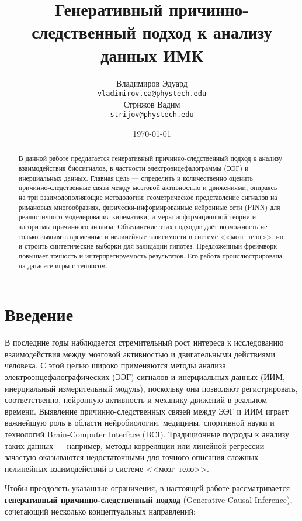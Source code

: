 \documentclass[a4paper, 12pt]{article}
\title{Генеративный причинно-следственный подход к анализу данных ИМК}
\author{Владимиров Эдуард \\
	\texttt{vladimirov.ea@phystech.edu} \\
	\And
	Стрижов Вадим \\
	\texttt{strijov@phystech.edu}
}
\date{\today}
\begin{document}
	\maketitle
	
	\begin{abstract}
		В данной работе предлагается генеративный причинно-следственный подход к анализу взаимодействия биосигналов, в частности электроэнцефалограммы (ЭЭГ) и инерциальных данных. Главная цель --- определить и количественно оценить причинно-следственные связи между мозговой активностью и движениями, опираясь на три взаимодополняющие методологии: геометрическое представление сигналов на римановых многообразиях, физически-информированные нейронные сети (PINN) для реалистичного моделирования кинематики, и меры информационной теории и алгоритмы причинного анализа. Объединение этих подходов даёт возможность не только выявлять временные и нелинейные зависимости в системе <<мозг--тело>>, но и строить синтетические выборки для валидации гипотез. Предложенный фреймворк повышает точность и интерпретируемость результатов. Его работа проиллюстрирована на датасете игры с теннисом.

	\end{abstract}
	
	
	
	\section{Введение}
	
	В последние годы наблюдается стремительный рост интереса к исследованию взаимодействия между мозговой активностью и двигательными действиями человека. С этой целью широко применяются методы анализа электроэнцефалографических (ЭЭГ) сигналов и инерциальных данных (ИИМ, инерциальный измерительный модуль), поскольку они позволяют регистрировать, соответственно, нейронную активность и механику движений в реальном времени. Выявление причинно-следственных связей между ЭЭГ и ИИМ играет важнейшую роль в области нейробиологии, медицины, спортивной науки и технологий Brain-Computer Interface (BCI). Традиционные подходы к анализу таких данных — например, методы корреляции или линейной регрессии — зачастую оказываются недостаточными для точного описания сложных нелинейных взаимодействий в системе <<мозг--тело>>.
	
	Чтобы преодолеть указанные ограничения, в настоящей работе рассматривается \textbf{генеративный причинно-следственный подход} (Generative Causal Inference), сочетающий несколько концептуальных направлений:
	
\end{document}
